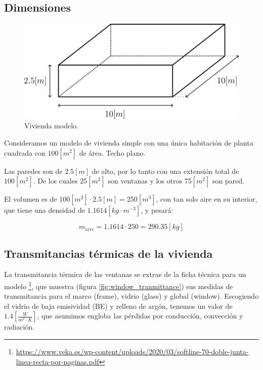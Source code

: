 \subsection{Dimensiones}

\begin{figure}[h] \centering
	\centering
	\includegraphics[width=1\textwidth]{./capitulos/resultados_discusion/images/modelo_vivienda.png}
	\caption{Vivienda modelo.}
	\label{fig:modelo_vivienda}
\end{figure}

Consideramos un modelo de vivienda simple con una única habitación de planta
cuadrada con $100[m^2]$ de área. Techo plano.

Las paredes son de $2.5[m]$ de alto, por lo tanto con una extensión total de
$100[m^2]$. De los cuales $25[m^2]$ son ventanas y los otros $75[m^2]$ son
pared.

El volumen es de $100[m^2] \cdot 2.5[m] = 250[m^3]$, con
tan solo aire en su interior, que tiene una densidad de
$1.1614[kg \cdot m^{-3}]$, y pesará:

\begin{equation}
	m_{aire} = 1.1614 \cdot 250 = 290.35[kg]
\end{equation}



\subsection{Transmitancias térmicas de la vivienda}

La transmitancia térmica de las ventanas se extrae de la ficha técnica para un
modelo
\footnote{\url{https://www.veka.es/wp-content/uploads/2020/03/softline-70-doble-junta-linea-recta-por-paginas.pdf}},
que muestra (figura \ref{fig:window_tranmittance}) sus medidas de transmitancia
para el marco (frame), vidrio (glass) y global (window). Escogiendo el vidrio
de baja emisividad (BE) y relleno de argón, tenemos un valor de
$1.4\left[\frac{W}{m^2 \cdot K}\right]$, que asumimos engloba las pérdidas por
conducción, convección y radiación.

